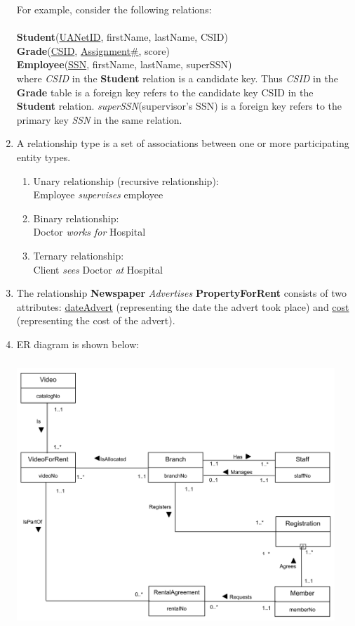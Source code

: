\documentclass[11pt]{article}
\begin{document}
\begin{enumerate}
  For example, consider the following relations:\\\\
  \textbf{Student}(\underline{UANetID}, firstName, lastName, CSID)\\
  \textbf{Grade}(\underline{CSID}, \underline{Assignment\#}, score)\\
  \textbf{Employee}(\underline{SSN}, firstName, lastName, superSSN)\\

  where \emph{CSID} in the \textbf{Student} relation is a candidate
  key. Thus \emph{CSID} in the \textbf{Grade} table is a foreign key
  refers to the candidate key CSID in the \textbf{Student}
  relation. \emph{superSSN}(supervisor's SSN) is a foreign key refers
  to the primary key \emph{SSN} in the same relation.

\item 
  A relationship type is a set of associations between one or more
  participating entity types.

  \begin{enumerate}
  \item Unary relationship (recursive relationship):\\
    Employee \emph{supervises} employee
  \item Binary relationship:\\
    Doctor \emph{works for} Hospital
  \item Ternary relationship:\\
    Client \emph{sees} Doctor \emph{at} Hospital
  \end{enumerate}

\item 
  The relationship \textbf{Newspaper} \emph{Advertises}
  \textbf{PropertyForRent} consists of two attributes:
  \underline{dateAdvert} (representing the date the advert took 
  place) and \underline{cost} (representing the cost of the advert).

\item ER diagram is shown below:
  \begin{center}
    \includegraphics[width=12cm,height=10cm]{./Q12-12.png}
  \end{center}


\end{enumerate}
\end{document}
